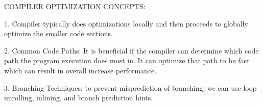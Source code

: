 COMPILER OPTIMIZATION CONCEPTS: 

1. Compiler typically does optimizations locally and then proceeds to globally optimize the smaller code sections. 

2. Common Code Paths: It is beneficial if the compiler can determine which code path the program execution does most in. It can optimize that path to be fast which can result in overall increase performance. 

3. Branching Techniques: to prevent misprediction of branching, we can use loop unrolling, inlining, and branch prediction hints. 

  